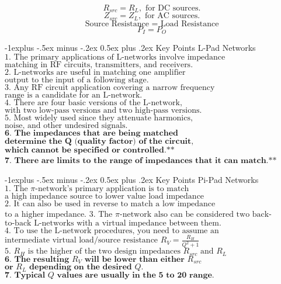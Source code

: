 \documentclass[10pt,landscape]{article}
\makeatletter
\renewcommand{\subsection}{\@startsection{subsection}{2}{0mm}%
                                {-1explus -.5ex minus -.2ex}%
                                {0.5ex plus .2ex}%
                                {\normalfont\normalsize\bfseries}}
\makeatother
\begin{document}
\begin{multicols}{3}
$$R_{src} = R_L, \text{ for DC sources.}$$
$$Z_{src} = Z_L, \text{ for AC sources.}$$
$$\text{Source Resistance = Load Resistance}$$
$$P_I = P_O$$  

\subsection{Key Points L-Pad Networks}  
$\text{1. The primary applications of L-networks involve impedance}$
$\text{matching in RF circuits, transmitters, and receivers.}$  
$\text{2. L-networks are useful in matching one amplifier}$
$\text{output to the input of a following stage.}$  
$\text{3. Any RF circuit application covering a narrow frequency}$  
$\text{range is a candidate for an L-network.}$  
$\text{4. There are four basic versions of the L-network,}$
$\text{with two low-pass versions and two high-pass versions.}$
$\text{5. Most widely used since they attenuate harmonics,}$
$\text{noise, and other undesired signals.}$
$\textbf{6. The impedances that are being matched}$
$\textbf{determine the Q (quality factor) of the circuit,}$
$\textbf{which cannot be specified or controlled.**}$
$\textbf{7. There are limits to the range of impedances}$
$\textbf{that it can match.**}$

\subsection{Key Points Pi-Pad Networks}  
$\text{1. The }\pi\text{-network’s primary application is to match}$
$\text{a high impedance source to lower value load impedance}$  
$\text{2. It can also be used in reverse to match a low impedance}$
$\text{to a higher impedance.}$  
$\text{3. The }\pi\text{-network also can be considered two back-}$  
$\text{to-back L-networks with a virtual impedance between them.}$  
$\text{4. To use the L-network procedures, you need to assume an}$
$\text{intermediate virtual load/source resistance } R_V = \frac{R_H}{Q^2 + 1}$
$\text{5. $R_H$ is the higher of the two design impedances } R_{src} \text{ and } R_L$
$\textbf{6. The resulting } R_V \textbf{ will be lower than either } R_{src}$
$\textbf{or } R_L \textbf{ depending on the desired } Q.$
$\textbf{7. Typical }Q \textbf{ values are usually in the 5 to 20 range.}$


\end{multicols}
\end{document}
